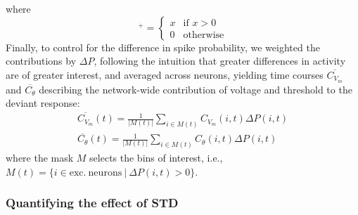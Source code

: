 \documentclass[10pt,letterpaper]{article}
\begin{document}
where
\begin{equation*}
    [x]^+ =
    \begin{cases}
        x & \text{if $x > 0$}\\
        0 & \text{otherwise}
    \end{cases}
\end{equation*}
Finally, to control for the difference in spike probability, we weighted the contributions by $\Delta P$, following the intuition that greater differences in activity are of greater interest, and averaged across neurons, yielding time courses $\overline{C_{V_m}}$ and $\overline{C_\theta}$ describing the network-wide contribution of voltage and threshold to the deviant response:
\begin{align}
    \overline{C_{V_m}}(t) = \frac{1}{|M(t)|} \sum_{i \in M(t)} C_{V_m}(i,t) \Delta P(i,t) \nonumber \\
    \overline{C_\theta}(t) = \frac{1}{|M(t)|} \sum_{i \in M(t)} C_\theta(i,t) \Delta P(i,t) \label{eq:mean_contrib}
\end{align}
where the mask $M$ selects the bins of interest, i.e., $M(t) = \{i \in \mathrm{exc.~neurons} ~|~ \Delta P(i,t) > 0\}$.

\subsubsection*{Quantifying the effect of STD}\label{sec:D}
\end{document}
